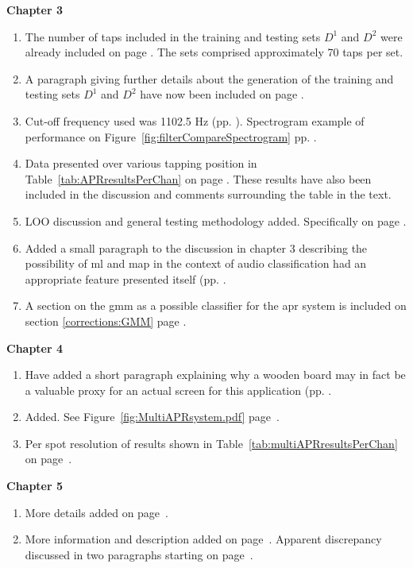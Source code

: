\textbf{Chapter 3}
\begin{enumerate}
\item The number of taps included in the training and testing sets $D^1$ and $D^2$ were already included on page \pageref{corrections:DSNcount}. The sets comprised approximately 70 taps per set.
\item A paragraph giving further details about the generation of the training and testing sets $D^1$ and $D^2$ have now been included on page \pageref{corrections:DSNmethod}.
\item Cut-off frequency used was 1102.5 Hz (pp. \pageref{corrections:cut-off}). Spectrogram example of performance on Figure~\ref{fig:filterCompareSpectrogram} pp. \pageref{fig:filterCompareSpectrogram}.
\item Data presented over various tapping position in Table~\ref{tab:APRresultsPerChan} on page \pageref{tab:APRresultsPerChan}. These results have also been included in the discussion and comments surrounding the table in the text.
\item LOO discussion and general testing methodology added. Specifically on page \pageref{corrections:LOO}.
\item Added a small paragraph to the discussion in chapter 3 describing the possibility of \gls{ml} and \gls{map} in the context of audio classification had an appropriate feature presented itself (pp. \pageref{corrections:ML}.
\item A section on the \gls{gmm} as a possible classifier for the \gls{apr} system is included on section \ref{corrections:GMM} page \pageref{corrections:GMM}.
\end{enumerate}

\textbf{Chapter 4}
\begin{enumerate}
\item Have added a short paragraph explaining why a wooden board may in fact be a valuable proxy for an actual screen for this application (pp. \label{corrections:wooden}.
\item Added. See Figure~\ref{fig:MultiAPRsystem.pdf} page~\pageref{fig:MultiAPRsystem.pdf}.
\item Per spot resolution of results shown in Table~\ref{tab:multiAPRresultsPerChan} on page~\pageref{tab:multiAPRresultsPerChan}.
\end{enumerate}

\textbf{Chapter 5}
\begin{enumerate}
\item More details added on page~\pageref{corrections:library}.
\item More information and description added on page~\pageref{corrections:further_quantify}. Apparent discrepancy discussed in two paragraphs starting on page~\pageref{corrections:discuss_discrep}.
\end{enumerate}

